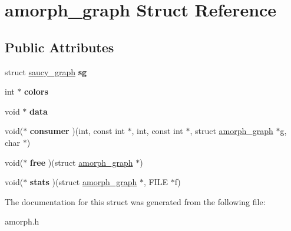 \hypertarget{structamorph__graph}{\section{amorph\-\_\-graph Struct Reference}
\label{structamorph__graph}
}
\subsection*{Public Attributes}
\begin{DoxyCompactItemize}
\item 
\hypertarget{structamorph__graph_a0f7bf3376e7fa2421a263246839b5934}{struct \hyperlink{structsaucy__graph}{saucy\-\_\-graph} {\bfseries sg}}\label{structamorph__graph_a0f7bf3376e7fa2421a263246839b5934}

\item 
\hypertarget{structamorph__graph_a8d2e2619f9288ce852c5e9a3ef558ef2}{int $\ast$ {\bfseries colors}}\label{structamorph__graph_a8d2e2619f9288ce852c5e9a3ef558ef2}

\item 
\hypertarget{structamorph__graph_a5aaaa9fec996b477335850cf0c8d685c}{void $\ast$ {\bfseries data}}\label{structamorph__graph_a5aaaa9fec996b477335850cf0c8d685c}

\item 
\hypertarget{structamorph__graph_a6ce2f6a6da1f04e2973fd8006dd0ff25}{void($\ast$ {\bfseries consumer} )(int, const int $\ast$, int, const int $\ast$, struct \hyperlink{structamorph__graph}{amorph\-\_\-graph} $\ast$g, char $\ast$)}\label{structamorph__graph_a6ce2f6a6da1f04e2973fd8006dd0ff25}

\item 
\hypertarget{structamorph__graph_a18da6e152a5d768612dfb2fe5f5ce50e}{void($\ast$ {\bfseries free} )(struct \hyperlink{structamorph__graph}{amorph\-\_\-graph} $\ast$)}\label{structamorph__graph_a18da6e152a5d768612dfb2fe5f5ce50e}

\item 
\hypertarget{structamorph__graph_a771bcce3472dbf8196de82955f9ed5b9}{void($\ast$ {\bfseries stats} )(struct \hyperlink{structamorph__graph}{amorph\-\_\-graph} $\ast$, F\-I\-L\-E $\ast$f)}\label{structamorph__graph_a771bcce3472dbf8196de82955f9ed5b9}

\end{DoxyCompactItemize}


The documentation for this struct was generated from the following file\-:\begin{DoxyCompactItemize}
\item 
amorph.\-h\end{DoxyCompactItemize}
